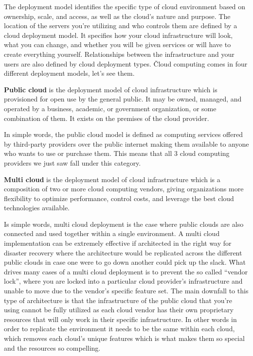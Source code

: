 The deployment model identifies the specific type of cloud environment based on ownership, scale, and access, as well
as the cloud's nature and purpose. The location of the servers you're utilizing and who controls them are defined by
a cloud deployment model. It specifies how your cloud infrastructure will look, what you can change, and whether you
will be given services or will have to create everything yourself. Relationships between the infrastructure and your
users are also defined by cloud deployment types. \v

Cloud computing comes in four different deployment models, let's see them.


\textbf{Public cloud} is the deployment model of cloud infrastructure which is provisioned for open use by the
general public. It may be owned, managed, and operated by a business, academic, or government organization, or some
combination of them. It exists on the premises of the cloud provider.
\ed


In simple words, the public cloud model is defined as computing services offered by third-party providers over the
public internet making them available to anyone who wants to use or purchase them. This means that all 3 cloud computing
providers we just saw fall under this category.


\textbf{Multi cloud} is the deployment model of cloud infrastructure which is a composition of two or more cloud
computing vendors, giving organizations more flexibility to optimize performance, control costs, and leverage the
best cloud technologies available.
\ed


Is simple words, multi cloud deployment is the case where public clouds are also connected and used together within a
single environment. A multi cloud implementation can be extremely effective if architected in the right way for
disaster recovery where the architecture would be replicated across the different public clouds in case one were to
go down another could pick up the slack. \v

What drives many cases of a multi cloud deployment is to prevent the so called ``vendor lock'', where you
are locked into a particular cloud provider's infrastructure and unable to move due to the vendor's specific feature
set. The main downfall to this type of architecture is that the infrastructure of the public cloud that you're using
cannot be fully utilized as each cloud vendor has their own proprietary resources that will only work in their
specific infrastructure. In other words in order to replicate the environment it needs to be the same within each
cloud, which removes each cloud's unique features which is what makes them so special and the resources so compelling.

